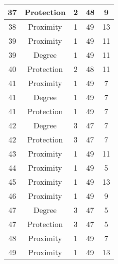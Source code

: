 \documentclass[results.tex]{subfiles}
\begin{document}
\begin{center}
\begin{tabular}{| c || c | c | c | c |}
    \hline
    37 & Protection & 2 & 48 & 9 \\ 
    \hline
    38 & Proximity & 1 & 49 & 13 \\ 
    \hline
    39 & Proximity & 1 & 49 & 11 \\ 
    \hline
    39 & Degree & 1 & 49 & 11 \\ 
    \hline
    40 & Protection & 2 & 48 & 11 \\ 
    \hline
    41 & Proximity & 1 & 49 & 7 \\ 
    \hline
    41 & Degree & 1 & 49 & 7 \\ 
    \hline
    41 & Protection & 1 & 49 & 7 \\ 
    \hline
    42 & Degree & 3 & 47 & 7 \\ 
    \hline
    42 & Protection & 3 & 47 & 7 \\ 
    \hline
    43 & Proximity & 1 & 49 & 11 \\ 
    \hline
    44 & Proximity & 1 & 49 & 5 \\ 
    \hline
    45 & Proximity & 1 & 49 & 13 \\ 
    \hline
    46 & Proximity & 1 & 49 & 9 \\ 
    \hline
    47 & Degree & 3 & 47 & 5 \\ 
    \hline
    47 & Protection & 3 & 47 & 5 \\ 
    \hline
    48 & Proximity & 1 & 49 & 7 \\ 
    \hline
    49 & Proximity & 1 & 49 & 13 \\ 
    \hline   \end{tabular}
\end{center}
\end{document}
